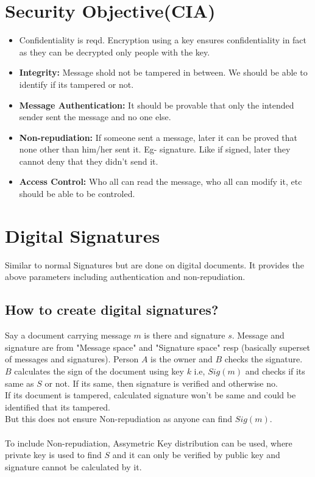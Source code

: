\documentclass[english, 11pt]{article}
\begin{document}
\section*{Security Objective(CIA)}
\begin{itemize}
  \item Confidentiality is reqd. Encryption using a key ensures confidentiality in fact as they can be decrypted only people with the key.
  \item \textbf{Integrity:} Message shold not be tampered in between. We should be able to identify if its tampered or not.
  \item \textbf{Message Authentication:} It should be provable that only the intended sender sent the message and no one else.
  \item \textbf{Non-repudiation:} If someone sent a message, later it can be proved that none other than him/her sent it. Eg- signature. Like if signed, later they cannot deny that they didn't send it.
  \item \textbf{Access Control:} Who all can read the message, who all can modify it, etc should be able to be controled.
\end{itemize}

\section*{Digital Signatures}
Similar to normal Signatures but are done on digital documents. It provides the above parameters including authentication and non-repudiation.
\subsection*{How to create digital signatures?}
Say a document carrying message $m$ is there and signature $s$. Message and signature are from "Message space" and "Signature space" resp (basically superset of messages and signatures).
Person $A$ is the owner and $B$ checks the signature. \\
$B$ calculates the sign of the document using key $k$ i.e, $Sig(m)$ and checks if its same as $S$ or not. If its same, then signature is verified and otherwise no.\\
If its document is tampered, calculated signature won't be same and could be identified that its tampered.\\
But this does not ensure Non-repudiation as anyone can find $Sig(m)$.\\ \\
To include Non-repudiation, Assymetric Key distribution can be used, where private key is used to find $S$ and it can only be verified by public key and signature cannot be calculated by it.
\end{document}
